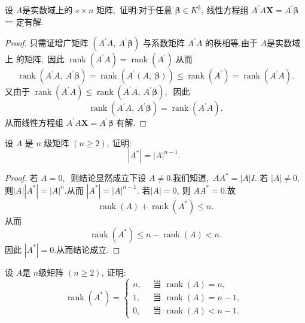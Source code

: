 \newpage
\begin{problem}
	设  $A  $是实数域上的  $s \times n $ 矩阵,\  证明:对于任意 $ \boldsymbol{\beta} \in K^{3} ,\  $线性方程组 $ A^{\prime} A \boldsymbol{X}=A^{\prime} \boldsymbol{\beta} $ 一 定有解.
\end{problem}
\begin{proof}
	只需证增广矩阵  $\left(A^{\prime} A,\  A^{\prime} \boldsymbol{\beta}\right) $ 与系数矩阵 $ A^{\prime} A $ 的秩相等.由于 $ A  $是实数域上 的矩阵,\  因此 $ \operatorname{rank}\left(A^{\prime} A\right)=\operatorname{rank}\left(A^{\prime}\right) .$从而
	$$\operatorname{rank}\left(A^{\prime} A,\  A^{\prime} \boldsymbol{\beta}\right)=\operatorname{rank}\left(A^{\prime}(A,\  \boldsymbol{\beta})\right) \leqslant \operatorname{rank}\left(A^{\prime}\right)=\operatorname{rank}\left(A^{\prime} A\right) .$$
	又由于  $\operatorname{rank}\left(A^{\prime} A\right) \leqslant \operatorname{rank}\left(A^{\prime} A,\  A^{\prime} \boldsymbol{\beta}\right) ,\ $ 因此
	$$\operatorname{rank}\left(A^{\prime} A,\  A^{\prime} \boldsymbol{\beta}\right)=\operatorname{rank}\left(A^{\prime} A\right) .$$
	从而线性方程组 $ A^{\prime} A \boldsymbol{X}=A^{\prime} \boldsymbol{\beta} $ 有解.
\end{proof}
\newpage
\begin{problem}
	设  $A$  是 $ n$  级矩阵  $(n \geqslant 2) ,\  $证明:
	$$\left|A^{*}\right|=|A|^{n-1} \text {. }$$
\end{problem}
\begin{proof}
	若 $ A=0 ,\ $ 则结论显然成立下设 $ A \neq 0 .$我们知道,\  $ A A^{*}=|A| I .$
	若 $ |A| \neq 0 ,\ $ 则$  |A|\left|A^{*}\right|=|A|^{n} .$从而  $\left|A^{*}\right|=|A|^{n-1} .$
	若$  |A|=0 ,\  $则 $ A A^{*}=0 .$故
	$$\operatorname{rank}(A)+\operatorname{rank}\left(A^{*}\right) \leqslant n . $$
	从而
	$$\operatorname{rank}\left(A^{*}\right) \leqslant n-\operatorname{rank}(A)<n .$$
	因此  $\left|A^{*}\right|=0  .$从而结论成立.
\end{proof}
\newpage
\begin{problem}
	设 $ A  $是  $n  $级矩阵 $ (n \geqslant 2) ,\  $证明:
	$$\operatorname{rank}\left(A^{*}\right)=\left\{\begin{array}{ll}
		n,\  & \text { 当 } \operatorname{rank}(A)=n,\  \\
		1,\  & \text { 当 } \operatorname{rank}(A)=n-1,\  \\
		0,\  & \text { 当 } \operatorname{rank}(A)<n-1 .
	\end{array}\right.$$
\end{problem}
